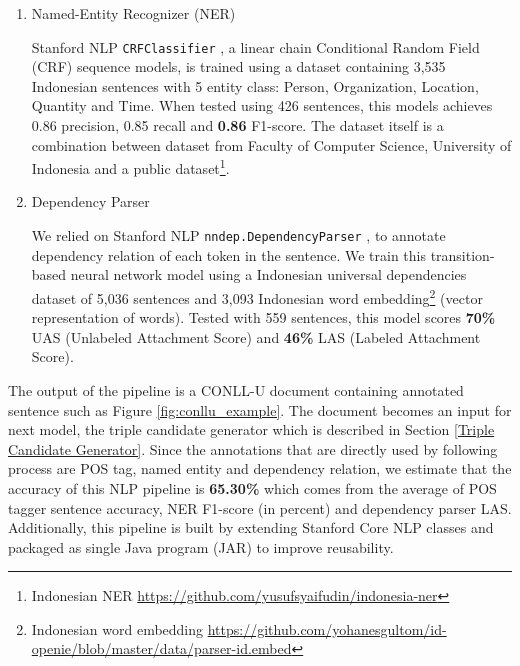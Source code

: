 \begin{enumerate}
This lemmatizer yields \textbf{99\%} accuracy when tested using dataset of 5,638 token-lemma pairs\footnote{Indonesian Lemmatizer \url{https://github.com/davidchristiandy/lemmatizer}}. We use lemma as one of the features for NER classifier. \\

\item Named-Entity Recognizer (NER)

Stanford NLP \verb|CRFClassifier| \citep{finkel2005incorporating}, a linear chain Conditional Random Field (CRF) sequence models, is trained using a dataset containing 3,535 Indonesian sentences with 5 entity class: Person, Organization, Location, Quantity and Time. When tested using 426 sentences, this models achieves 0.86 precision, 0.85 recall and \textbf{0.86} F1-score. The dataset itself is a combination between dataset from Faculty of Computer Science, University of Indonesia and a public dataset\footnote{Indonesian NER \url{https://github.com/yusufsyaifudin/indonesia-ner}}. \\

\item Dependency Parser

We relied on Stanford NLP \verb|nndep.DependencyParser| \citep{chen2014fast}, to annotate dependency relation of each token in the sentence. We train this transition-based neural network model using a Indonesian universal dependencies dataset of 5,036 sentences and 3,093 Indonesian word embedding\footnote{Indonesian word embedding \url{https://github.com/yohanesgultom/id-openie/blob/master/data/parser-id.embed}} (vector representation of words). Tested with 559 sentences, this model scores \textbf{70\%} UAS (Unlabeled Attachment Score) and \textbf{46\%} LAS (Labeled Attachment Score).

\end{enumerate}

The output of the pipeline is a CONLL-U document containing annotated sentence such as Figure \ref{fig:conllu_example}. The document becomes an input for next model, the triple candidate generator which is described in Section \ref{Triple Candidate Generator}. Since the annotations that are directly used by following process are POS tag, named entity and dependency relation, we estimate that the accuracy of this NLP pipeline is \textbf{65.30\%} which comes from the average of POS tagger sentence accuracy, NER F1-score (in percent) and dependency parser LAS. Additionally, this pipeline is built by extending Stanford Core NLP classes and packaged as single Java program (JAR) to improve reusability.

